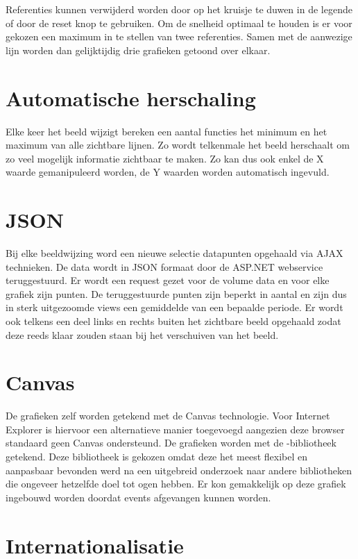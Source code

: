 Referenties kunnen verwijderd worden door op het kruisje te duwen in de legende of door de reset knop te gebruiken. Om de snelheid optimaal te houden is er voor gekozen een maximum in te stellen van twee referenties. Samen met de aanwezige lijn worden dan gelijktijdig drie grafieken getoond over elkaar.

\section{Automatische herschaling}

Elke keer het beeld wijzigt bereken een aantal functies het minimum en het maximum van alle zichtbare lijnen. Zo wordt telkenmale het beeld herschaalt om zo veel mogelijk informatie zichtbaar te maken. Zo kan dus ook enkel de X waarde gemanipuleerd worden, de Y waarden worden automatisch ingevuld.

\section{JSON}

Bij elke beeldwijzing word een nieuwe selectie datapunten opgehaald via AJAX technieken. De data wordt in JSON formaat door de ASP.NET webservice teruggestuurd.
Er wordt een request gezet voor de volume data en voor elke grafiek zijn punten. De teruggestuurde punten zijn beperkt in aantal en zijn dus in sterk uitgezoomde views een gemiddelde van een bepaalde periode. Er wordt ook telkens een deel links en rechts buiten het zichtbare beeld opgehaald zodat deze reeds klaar zouden staan bij het verschuiven van het beeld.

\section{Canvas}

De grafieken zelf worden getekend met de Canvas technologie. Voor Internet Explorer is hiervoor een alternatieve manier toegevoegd aangezien deze browser standaard geen Canvas ondersteund. De grafieken worden met de -bibliotheek getekend. Deze bibliotheek is gekozen omdat deze het meest flexibel en aanpasbaar bevonden werd na een uitgebreid onderzoek naar andere bibliotheken die ongeveer hetzelfde doel tot ogen hebben. Er kon gemakkelijk op deze grafiek ingebouwd worden doordat events afgevangen kunnen worden.

\section{Internationalisatie}

